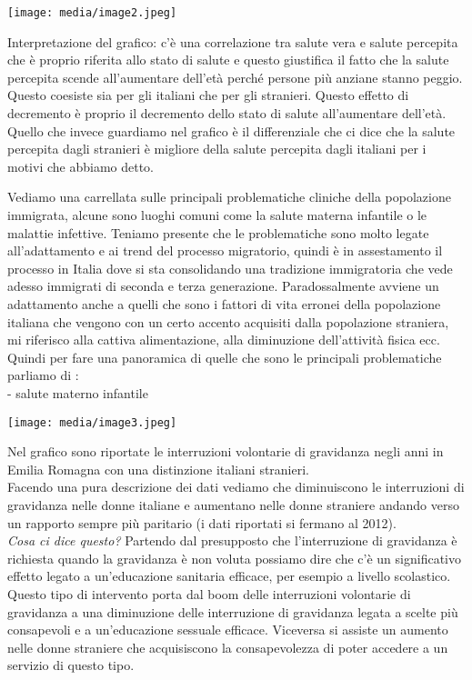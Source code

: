 \documentclass[]{article}
\begin{document}
\texttt{[image: media/image2.jpeg]}

Interpretazione del grafico: c'è una correlazione tra salute vera e
salute percepita che è proprio riferita allo stato di salute e questo
giustifica il fatto che la salute percepita scende all'aumentare
dell'età perché persone più anziane stanno peggio. Questo coesiste sia
per gli italiani che per gli stranieri. Questo effetto di decremento è
proprio il decremento dello stato di salute all'aumentare dell'età.\\
Quello che invece guardiamo nel grafico è il differenziale che ci dice
che la salute percepita dagli stranieri è migliore della salute
percepita dagli italiani per i motivi che abbiamo detto.

Vediamo una carrellata sulle principali problematiche cliniche della
popolazione immigrata, alcune sono luoghi comuni come la salute materna
infantile o le malattie infettive. Teniamo presente che le problematiche
sono molto legate all'adattamento e ai trend del processo migratorio,
quindi è in assestamento il processo in Italia dove si sta consolidando
una tradizione immigratoria che vede adesso immigrati di seconda e terza
generazione. Paradossalmente avviene un adattamento anche a quelli che
sono i fattori di vita erronei della popolazione italiana che vengono
con un certo accento acquisiti dalla popolazione straniera, mi riferisco
alla cattiva alimentazione, alla diminuzione dell'attività fisica ecc.\\
Quindi per fare una panoramica di quelle che sono le principali
problematiche parliamo di :\\
- salute materno infantile

\texttt{[image: media/image3.jpeg]}

Nel grafico sono riportate le interruzioni volontarie di gravidanza
negli anni in Emilia Romagna con una distinzione italiani stranieri.\\
Facendo una pura descrizione dei dati vediamo che diminuiscono le
interruzioni di gravidanza nelle donne italiane e aumentano nelle donne
straniere andando verso un rapporto sempre più paritario (i dati
riportati si fermano al 2012).\\
\emph{Cosa ci dice questo?} Partendo dal presupposto che l'interruzione
di gravidanza è richiesta quando la gravidanza è non voluta possiamo
dire che c'è un significativo effetto legato a un'educazione sanitaria
efficace, per esempio a livello scolastico. Questo tipo di intervento
porta dal boom delle interruzioni volontarie di gravidanza a una
diminuzione delle interruzione di gravidanza legata a scelte più
consapevoli e a un'educazione sessuale efficace. Viceversa si assiste un
aumento nelle donne straniere che acquisiscono la consapevolezza di
poter accedere a un servizio di questo tipo.
\end{document}
